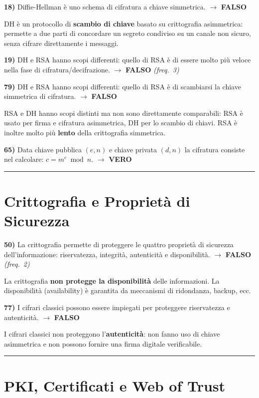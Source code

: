 \documentclass[12pt, a4paper]{report}
\newcommand{\vero}{\textcolor{verdeanswer}{\textbf{VERO}}}
\newcommand{\falso}{\textcolor{rossoanswer}{\textbf{FALSO}}}
\newcommand{\freq}[1]{\textcolor{freqcolor}{\textit{(freq.\ #1)}}}
\begin{document}
\medskip
\noindent\textbf{18)} Diffie-Hellman è uno schema di cifratura a chiave simmetrica. $\to$ \falso{}

\medskip
\noindent DH è un protocollo di \textbf{scambio di chiave} basato su crittografia asimmetrica: permette a due parti di concordare un segreto condiviso su un canale non sicuro, senza cifrare direttamente i messaggi.

\medskip
\noindent\textbf{19)} DH e RSA hanno scopi differenti: quello di RSA è di essere molto più veloce nella fase di cifratura/decifrazione. $\to$ \falso{} \freq{3}

\medskip
\noindent\textbf{79)} DH e RSA hanno scopi differenti: quello di RSA è di scambiarsi la chiave simmetrica di cifratura. $\to$ \falso{}

\medskip
\noindent RSA e DH hanno scopi distinti ma non sono direttamente comparabili: RSA è usato per firma e cifratura asimmetrica, DH per lo scambio di chiavi. RSA è inoltre molto più \textbf{lento} della crittografia simmetrica.

\medskip
\noindent\textbf{65)} Data chiave pubblica $(e,n)$ e chiave privata $(d,n)$ la cifratura consiste nel calcolare: $c = m^e \bmod n$. $\to$ \vero{}

\noindent\rule{\textwidth}{0.4pt}

\section{Crittografia e Proprietà di Sicurezza}

\noindent\textbf{50)} La crittografia permette di proteggere le quattro proprietà di sicurezza dell'informazione: riservatezza, integrità, autenticità e disponibilità. $\to$ \falso{} \freq{2}

\medskip
\noindent La crittografia \textbf{non protegge la disponibilità} delle informazioni. La disponibilità (availability) è garantita da meccanismi di ridondanza, backup, ecc.

\medskip
\noindent\textbf{77)} I cifrari classici possono essere impiegati per proteggere riservatezza e autenticità. $\to$ \falso{}

\medskip
\noindent I cifrari classici non proteggono l'\textbf{autenticità}: non fanno uso di chiave asimmetrica e non possono fornire una firma digitale verificabile.

\noindent\rule{\textwidth}{0.4pt}

\section{PKI, Certificati e Web of Trust}
\end{document}
